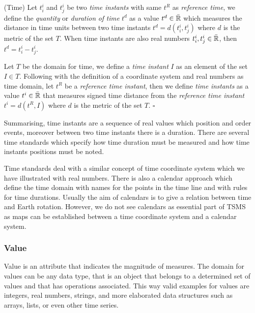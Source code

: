 \begin{definition}(Time)
  \label{def:model:temps}
  Let $t^i_i$ and $t^i_j$ be two \emph{time instants} with same $t^R$
  as \emph{reference time}, we define the \emph{quantity} or
  \emph{duration of time} $t^d$ as a value $t^d \in\bar{\mathbb{R}}$ which measures
  the distance in time units between two time instants $t^d =
  d(t^i_i,t^i_j)$ where $d$ is the metric of the set $T$. When time
  instants are also real numbers $t^i_i , t^i_j \in \bar{\mathbb{R}}$, then $t^d =
  t^i_i - t^i_j$.

  Let $T$ be the domain for time, we define a \emph{time instant} $I$
  as an element of the set $I \in T$. Following with the definition of
  a coordinate system and real numbers as time domain, let $t^{R}$ be
  a \emph{reference time instant}, then we define \emph{time instants}
  as a value $t^i \in\bar{\mathbb{R}}$ that measures signed time distance from the
  \emph{reference time instant} $t^i= d(t^{R},I)$ where $d$ is the
  metric of the set $T$. $\square$
\end{definition}

Summarising, time instants are a sequence of real values which
position and order events, moreover between two time instants there is
a duration.  There are several time standards \cite{allen:timescales}
which specify how time duration must be measured and how time instants
positions must be noted. 

Time standards deal with a similar concept of
time coordinate system which we have illustrated with real
numbers. There is also a calendar approach which define the time
domain with names for the points in the time line and with rules for
time durations. Usually the aim of calendars is to give a relation
between time and Earth rotation. However, we do not see calendars as
essential part of TSMS \cite{dreyer94} as maps can be established
between a time coordinate system and a calendar system.


\subsubsection{Value}

Value is an attribute that indicates the magnitude of measures. The
domain for values can be any data type, that is an object that belongs
to a determined set of values and that has operations associated.
This way valid examples for values are integers, real numbers,
strings, and more elaborated data structures such as arrays, lists, or
even other time series.

